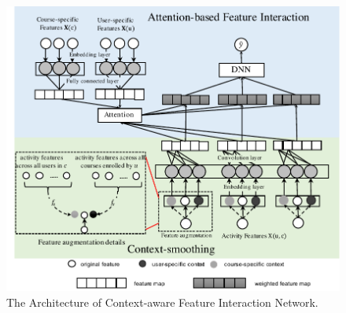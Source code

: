  \begin{figure}
 \hspace{-0.1in}
	\centering
	\includegraphics[width=\linewidth]{model_arch.pdf}
	
	\caption{The Architecture of Context-aware Feature Interaction Network.}
	\label{fig:modelArch}
\end{figure}



    
     
